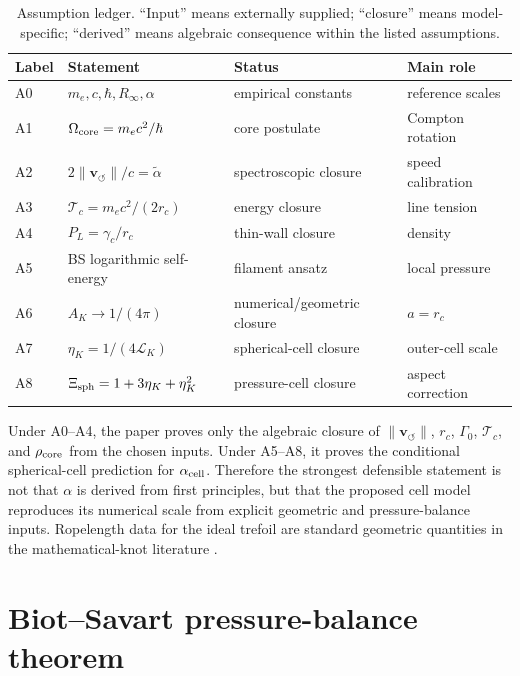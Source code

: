 \documentclass[aps,pra,preprint,longbibliography,nofootinbib]{revtex4-2}
\newcommand{\vnorm}{\lVert\mathbf{v}_{\!\boldsymbol{\circlearrowleft}}\rVert} %
\newcommand{\Tc}{\mathcal{T}_c}                  %
\begin{document}
\begin{table}[h]
\centering
\caption{Assumption ledger.  ``Input'' means externally supplied; ``closure''
means model-specific; ``derived'' means algebraic consequence within the
listed assumptions.}
\label{tab:app_assumption_ledger}
\scriptsize
\begin{tabular}{@{}llll@{}}
\toprule
Label & Statement & Status & Main role \\
\midrule
A0 & $m_e,c,\hbar,R_\infty,\alpha$ & empirical constants & reference scales \\
A1 & $\Omega_{\rm core}=m_ec^2/\hbar$ & core postulate & Compton rotation \\
A2 & $2\vnorm/c=\tilde\alpha$ & spectroscopic closure & speed calibration \\
A3 & $\Tc=m_ec^2/(2r_c)$ & energy closure & line tension \\
A4 & $P_L=\gamma_c/r_c$ & thin-wall closure & density \\
A5 & BS logarithmic self-energy & filament ansatz & local pressure \\
A6 & $A_K\to1/(4\pi)$ & numerical/geometric closure & $a=r_c$ \\
A7 & $\eta_K=1/(4\mathcal L_K)$ & spherical-cell closure & outer-cell scale \\
A8 & $\Xi_{\rm sph}=1+3\eta_K+\eta_K^2$ & pressure-cell closure & aspect correction \\
\bottomrule
\end{tabular}
\end{table}

Under A0--A4, the paper proves only the algebraic closure of
$\vnorm$, $r_c$, $\Gamma_0$, $\Tc$, and $\rho_{\rm core}$ from the chosen
inputs.  Under A5--A8, it proves the conditional spherical-cell prediction
for $\alpha_{\rm cell}$.  Therefore the strongest defensible statement is
not that $\alpha$ is derived from first principles, but that the proposed
cell model reproduces its numerical scale from explicit geometric and
pressure-balance inputs.  Ropelength data for the ideal trefoil are standard
geometric quantities in the mathematical-knot literature
\cite{Cantarella2002}.

\section{Biot--Savart pressure-balance theorem}
\label{app:bs_pressure}
\end{document}
